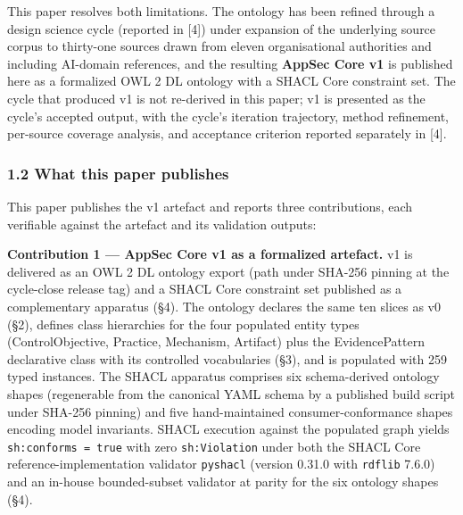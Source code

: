 \documentclass[
]{article}
\begin{document}
This paper resolves both limitations. The ontology has been refined
through a design science cycle (reported in {[}4{]}) under expansion of
the underlying source corpus to thirty-one sources drawn from eleven
organisational authorities and including AI-domain references, and the
resulting \textbf{AppSec Core v1} is published here as a formalized OWL
2 DL ontology with a SHACL Core constraint set. The cycle that produced
v1 is not re-derived in this paper; v1 is presented as the cycle's
accepted output, with the cycle's iteration trajectory, method
refinement, per-source coverage analysis, and acceptance criterion
reported separately in {[}4{]}.

\subsubsection{1.2 What this paper
publishes}\label{what-this-paper-publishes}

This paper publishes the v1 artefact and reports three contributions,
each verifiable against the artefact and its validation outputs:

\textbf{Contribution 1 --- AppSec Core v1 as a formalized artefact.} v1
is delivered as an OWL 2 DL ontology export (path under SHA-256 pinning
at the cycle-close release tag) and a SHACL Core constraint set
published as a complementary apparatus (§4). The ontology declares the
same ten slices as v0 (§2), defines class hierarchies for the four
populated entity types (ControlObjective, Practice, Mechanism, Artifact)
plus the EvidencePattern declarative class with its controlled
vocabularies (§3), and is populated with 259 typed instances. The SHACL
apparatus comprises six schema-derived ontology shapes (regenerable from
the canonical YAML schema by a published build script under SHA-256
pinning) and five hand-maintained consumer-conformance shapes encoding
model invariants. SHACL execution against the populated graph yields
\texttt{sh:conforms\ =\ true} with zero \texttt{sh:Violation} under both
the SHACL Core reference-implementation validator \texttt{pyshacl}
(version 0.31.0 with \texttt{rdflib} 7.6.0) and an in-house
bounded-subset validator at parity for the six ontology shapes (§4).
\end{document}
